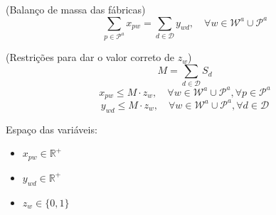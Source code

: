 \documentclass[12pt,a4paper]{article}
\begin{document}


\begin{center}
    (Balanço de massa das fábricas)
    \begin{equation} %
        \sum_{p \in \mathcal{P}^{a}} x_{pw} =
        \sum_{d \in \mathcal{D}} y_{wd}, \quad
        \forall w \in \mathcal{W}^{a} \cup \mathcal{P}^{a}
    \end{equation}
\end{center}

\begin{center}
    (Restrições para dar o valor correto de $z_{w}$)
    \begin{equation}
        M = \sum_{d \in \mathcal{D}} S_{d}
    \end{equation}
    \begin{equation}
        x_{pw} \leq M \cdot z_w, \quad \forall w \in \mathcal{W}^{a} \cup \mathcal{P}^{a}, \forall p \in \mathcal{P}^{a}
    \end{equation}
    \begin{equation}
        y_{wd} \leq M \cdot z_w, \quad \forall w \in \mathcal{W}^{a} \cup \mathcal{P}^{a}, \forall d \in \mathcal{D}
    \end{equation}
\end{center}


Espaço das variáveis:

\begin{itemize}
    \item $x_{pw} \in \mathbb{R}^+$
    \item $y_{wd} \in \mathbb{R}^+$
    \item $z_{w} \in \{0, 1\}$
\end{itemize}
\end{document}
